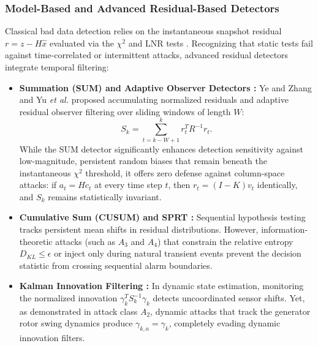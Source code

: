\documentclass[journal,compsoc]{IEEEtran}
\begin{document}
\subsubsection{Model-Based and Advanced Residual-Based Detectors}
Classical bad data detection relies on the instantaneous snapshot residual $r = z - H\hat{x}$ evaluated via the $\chi^2$ and LNR tests \cite{ref10, ref29}. Recognizing that static tests fail against time-correlated or intermittent attacks, advanced residual detectors integrate temporal filtering:
\begin{itemize}
    \item \textbf{Summation (SUM) and Adaptive Observer Detectors \cite{ref18, ref72}:} Ye and Zhang \cite{ref18} and Yu \textit{et al.} \cite{ref72} proposed accumulating normalized residuals and adaptive residual observer filtering over sliding windows of length $W$:
    \begin{equation}
        S_k = \sum_{t=k-W+1}^k r_t^T R^{-1} r_t.
    \end{equation}
    While the SUM detector significantly enhances detection sensitivity against low-magnitude, persistent random biases that remain beneath the instantaneous $\chi^2$ threshold, it offers zero defense against column-space attacks: if $a_t = Hc_t$ at every time step $t$, then $r_t = (I - K)v_t$ identically, and $S_k$ remains statistically invariant.
    \item \textbf{Cumulative Sum (CUSUM) and SPRT \cite{ref10}:} Sequential hypothesis testing tracks persistent mean shifts in residual distributions. However, information-theoretic attacks (such as $A_3$ and $A_4$) that constrain the relative entropy $D_{KL} \le \epsilon$ or inject only during natural transient events prevent the decision statistic from crossing sequential alarm boundaries.
    \item \textbf{Kalman Innovation Filtering \cite{ref19}:} In dynamic state estimation, monitoring the normalized innovation $\gamma_k^T S_k^{-1} \gamma_k$ detects uncoordinated sensor shifts. Yet, as demonstrated in attack class $A_2$, dynamic attacks that track the generator rotor swing dynamics produce $\gamma_{k,a} = \gamma_k$, completely evading dynamic innovation filters.
\end{itemize}
\end{document}
